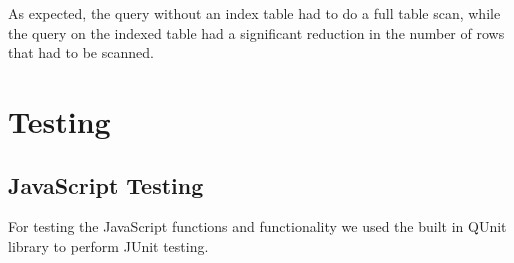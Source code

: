 \documentclass{article}
\begin{document}
As expected, the query without an index table had to do a full table scan,
while the query on the indexed table had a significant reduction in the
number of rows that had to be scanned.

\section{Testing}
\subsection{JavaScript Testing}
For testing the JavaScript functions and functionality we used the built in QUnit library to perform JUnit testing.
\end{document}
